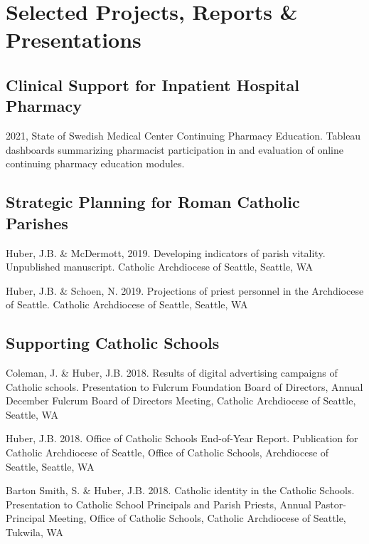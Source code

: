 \documentclass[
  letterpaper,
]{article}
\begin{document}
\section{Selected Projects, Reports \&
Presentations}\label{selected-projects-reports-presentations}

\subsection{Clinical Support for Inpatient Hospital
Pharmacy}\label{clinical-support-for-inpatient-hospital-pharmacy}

2021, State of Swedish Medical Center Continuing Pharmacy Education.
Tableau dashboards summarizing pharmacist participation in and
evaluation of online continuing pharmacy education modules.

\subsection{Strategic Planning for Roman Catholic
Parishes}\label{strategic-planning-for-roman-catholic-parishes}

Huber, J.B. \& McDermott, 2019. Developing indicators of parish
vitality. Unpublished manuscript. Catholic Archdiocese of Seattle,
Seattle, WA

Huber, J.B. \& Schoen, N. 2019. Projections of priest personnel in the
Archdiocese of Seattle. Catholic Archdiocese of Seattle, Seattle, WA

\subsection{Supporting Catholic
Schools}\label{supporting-catholic-schools}

Coleman, J. \& Huber, J.B. 2018. Results of digital advertising
campaigns of Catholic schools. Presentation to Fulcrum Foundation Board
of Directors, Annual December Fulcrum Board of Directors Meeting,
Catholic Archdiocese of Seattle, Seattle, WA

Huber, J.B. 2018. Office of Catholic Schools End-of-Year Report.
Publication for Catholic Archdiocese of Seattle, Office of Catholic
Schools, Archdiocese of Seattle, Seattle, WA

Barton Smith, S. \& Huber, J.B. 2018. Catholic identity in the Catholic
Schools. Presentation to Catholic School Principals and Parish Priests,
Annual Pastor-Principal Meeting, Office of Catholic Schools, Catholic
Archdiocese of Seattle, Tukwila, WA
\end{document}
